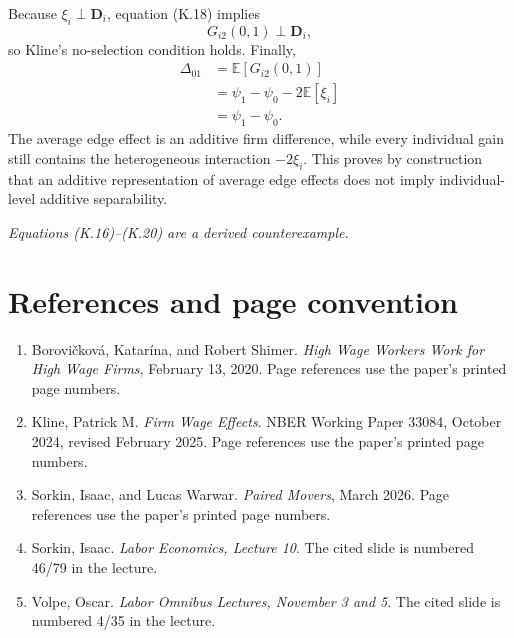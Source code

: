 \documentclass[11pt]{article}
\begin{document}
Because \(\xi_i\perp\mathbf D_i\), equation (K.18) implies
\[
G_{i2}(0,1)\perp\mathbf D_i,
\tag{K.19}
\]
so Kline's no-selection condition holds.  Finally,
\[
\begin{aligned}
\Delta_{01}
&=
\mathbb E[G_{i2}(0,1)]\\
&=
\psi_1-\psi_0-2\mathbb E[\xi_i]\\
&=
\psi_1-\psi_0.
\end{aligned}
\tag{K.20}
\]
The average edge effect is an additive firm difference, while every
individual gain still contains the heterogeneous interaction
\(-2\xi_i\).  This proves by construction that an additive representation
of average edge effects does not imply individual-level additive
separability.

\textit{Equations (K.16)--(K.20) are a derived counterexample.}

\section*{References and page convention}

\begin{enumerate}
\item Borovi\v{c}kov\'a, Katar\'ina, and Robert Shimer.
\emph{High Wage Workers Work for High Wage Firms}, February 13, 2020.
Page references use the paper's printed page numbers.
\item Kline, Patrick M.  \emph{Firm Wage Effects}.  NBER Working Paper
33084, October 2024, revised February 2025.  Page references use the
paper's printed page numbers.
\item Sorkin, Isaac, and Lucas Warwar.  \emph{Paired Movers}, March 2026.
Page references use the paper's printed page numbers.
\item Sorkin, Isaac.  \emph{Labor Economics, Lecture 10}.  The cited slide
is numbered 46/79 in the lecture.
\item Volpe, Oscar.  \emph{Labor Omnibus Lectures, November 3 and 5}.
The cited slide is numbered 4/35 in the lecture.
\end{enumerate}
\end{document}
